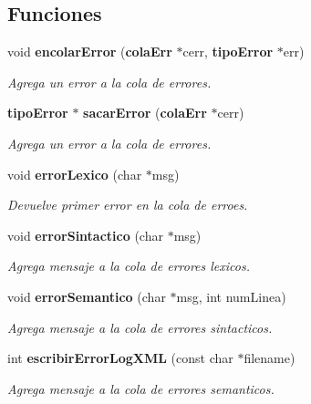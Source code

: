 \subsection*{Funciones}
\begin{CompactItemize}
\item 
void {\bf encolar\-Error} ({\bf cola\-Err} $\ast$cerr, {\bf tipo\-Error} $\ast$err)
\begin{CompactList}\small\item\em Agrega un error a la cola de errores. \item\end{CompactList}\item 
{\bf tipo\-Error} $\ast$ {\bf sacar\-Error} ({\bf cola\-Err} $\ast$cerr)
\begin{CompactList}\small\item\em Agrega un error a la cola de errores. \item\end{CompactList}\item 
void {\bf error\-Lexico} (char $\ast$msg)
\begin{CompactList}\small\item\em Devuelve primer error en la cola de erroes. \item\end{CompactList}\item 
void {\bf error\-Sintactico} (char $\ast$msg)
\begin{CompactList}\small\item\em Agrega mensaje a la cola de errores lexicos. \item\end{CompactList}\item 
void {\bf error\-Semantico} (char $\ast$msg, int num\-Linea)
\begin{CompactList}\small\item\em Agrega mensaje a la cola de errores sintacticos. \item\end{CompactList}\item 
int {\bf escribir\-Error\-Log\-XML} (const char $\ast$filename)
\begin{CompactList}\small\item\em Agrega mensaje a la cola de errores semanticos. \item\end{CompactList}\end{CompactItemize}
